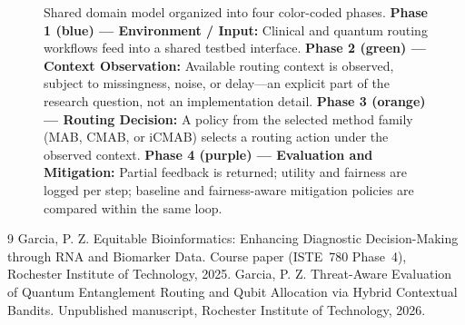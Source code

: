 \documentclass{IEEEtran}
\begin{document}
\begin{figure}[!b]
{%
}
\caption{%
  Shared domain model organized into four color-coded phases.
  \textcolor{phase1blue}{\textbf{Phase 1 (blue) --- Environment / Input:}}
    Clinical and quantum routing workflows feed into a shared testbed interface.
  \textcolor{phase2green}{\textbf{Phase 2 (green) --- Context Observation:}}
    Available routing context is observed, subject to missingness, noise, or
    delay---an explicit part of the research question, not an implementation detail.
  \textcolor{phase3orange}{\textbf{Phase 3 (orange) --- Routing Decision:}}
    A policy from the selected method family (MAB, CMAB, or iCMAB) selects a
    routing action under the observed context.
  \textcolor{phase4purple}{\textbf{Phase 4 (purple) --- Evaluation and Mitigation:}}
    Partial feedback is returned; utility and fairness are logged per step;
    baseline and fairness-aware mitigation policies are compared within the same loop.}
\label{fig:domain_model}
\end{figure}

\begin{thebibliography}{9}\setlength{\itemsep}{0em}
Garcia, P. Z. Equitable Bioinformatics: Enhancing Diagnostic
Decision-Making through {RNA} and Biomarker Data. Course paper
(ISTE~780 Phase~4), Rochester Institute of Technology, 2025.
Garcia, P. Z. Threat-Aware Evaluation of Quantum Entanglement Routing
and Qubit Allocation via Hybrid Contextual Bandits. Unpublished
manuscript, Rochester Institute of Technology, 2026.
\end{thebibliography}
\end{document}
